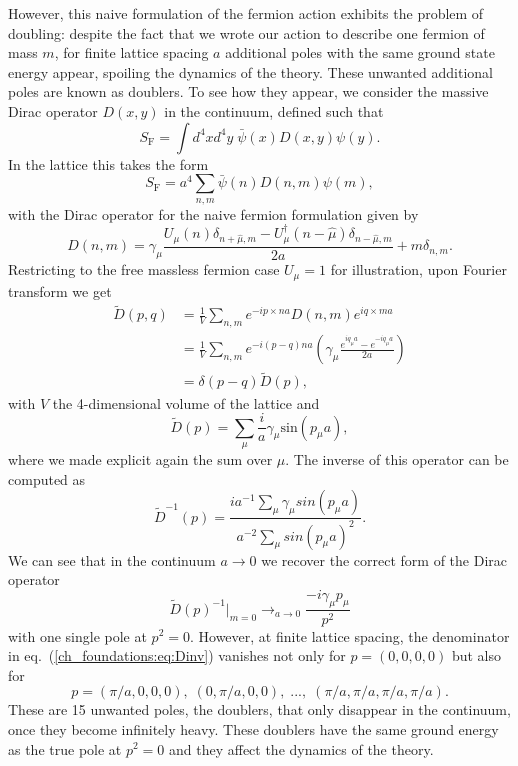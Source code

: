 However, this naive formulation of the fermion action exhibits the problem of doubling: despite the fact that we wrote our action to describe one fermion of mass $m$, for finite lattice spacing $a$ additional poles with the same ground state energy appear, spoiling the dynamics of the theory. These unwanted additional poles are known as doublers. To see how they appear, we consider the massive Dirac operator $D(x,y)$ in the continuum, defined such that
\begin{equation}
S_{\textrm{F}}=\int d^4xd^4y\;\bar{\psi}(x)D(x,y)\psi(y).
\end{equation}
In the lattice this takes the form
\begin{equation}
S_{\textrm{F}}=a^4\sum_{n,m}\bar{\psi}(n)D(n,m)\psi(m),
\end{equation}
with the Dirac operator for the naive fermion formulation given by
\begin{equation}
D(n,m)=\gamma_{\mu}\frac{U_{\mu}(n)\delta_{n+\hat{\mu},m}-U_{\mu}^{\dagger}(n-\hat{\mu})\delta_{n-\hat{\mu},m}}{2a}+m\delta_{n,m}.
\end{equation}
Restricting to the free massless fermion case $U_{\mu}=1$ for illustration, upon Fourier transform we get
\begin{align}
\tilde{D}(p,q)&=\frac{1}{V}\sum_{n,m}e^{-ip\times na}D(n,m)e^{iq\times ma}\\
&=\frac{1}{V}\sum_{n,m}e^{-i(p-q)na}\left(\gamma_{\mu}\frac{e^{iq_{\mu}a}-e^{-iq_{\mu}a}}{2a}\right)\\
&=\delta(p-q)\tilde{D}(p),
\end{align}
with $V$ the 4-dimensional volume of the lattice and
\begin{equation}
\tilde{D}(p)=\sum_{\mu}\frac{i}{a}\gamma_{\mu}\textrm{sin}(p_{\mu}a),
\end{equation}
where we made explicit again the sum over $\mu$. The inverse of this operator can be computed as
\begin{equation}
\label{ch_foundations:eq:Dinv}
\tilde{D}^{-1}(p)=\frac{ia^{-1}\sum_{\mu}\gamma_{\mu}sin(p_{\mu}a)}{a^{-2}\sum_{\mu}sin(p_{\mu}a)^2}.
\end{equation}
We can see that in the continuum $a\rightarrow0$ we recover the correct form of the Dirac operator
\begin{equation}
\tilde{D}(p)^{-1}|_{m=0}\rightarrow_{a\rightarrow0}\frac{-i\gamma_{\mu}p_{\mu}}{p^2}
\end{equation}
with one single pole at $p^2=0$. However, at finite lattice spacing, the denominator in eq.~(\ref{ch_foundations:eq:Dinv}) vanishes not only for $p=(0,0,0,0)$ but also for 
\begin{equation}
p=(\pi/a,0,0,0),\;(0,\pi/a,0,0),\;...,\;(\pi/a,\pi/a,\pi/a,\pi/a).
\end{equation}
These are 15 unwanted poles, the doublers, that only disappear in the continuum, once they become infinitely heavy. These doublers have the same ground energy as the true pole at $p^2=0$ and they affect the dynamics of the theory. 

